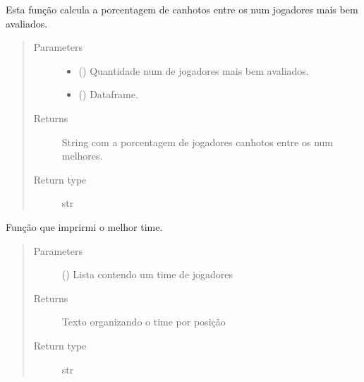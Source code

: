 \documentclass[letterpaper,10pt,brazil]{sphinxmanual}
\begin{document}

\begin{fulllineitems}
\label{\detokenize{solucao_fifa:solucao_fifa.porcentagem_canhoto}}
Esta função calcula a porcentagem de canhotos entre os num jogadores mais bem avaliados.
\begin{quote}\begin{description}
\item[{Parameters}] \leavevmode\begin{itemize}
\item {} 
 () \textendash{} Quantidade num de jogadores mais bem avaliados.

\item {} 
 () \textendash{} Dataframe.

\end{itemize}

\item[{Returns}] \leavevmode
String com a porcentagem de jogadores canhotos entre os num melhores.

\item[{Return type}] \leavevmode
str

\end{description}\end{quote}

\end{fulllineitems}


\begin{fulllineitems}
\label{\detokenize{solucao_fifa:solucao_fifa.print_melhor_time}}
Função que imprirmi o melhor time.
\begin{quote}\begin{description}
\item[{Parameters}] \leavevmode
{} () \textendash{} Lista contendo um time de jogadores

\item[{Returns}] \leavevmode
Texto organizando o time por posição

\item[{Return type}] \leavevmode
str

\end{description}\end{quote}

\end{fulllineitems}
\end{document}

